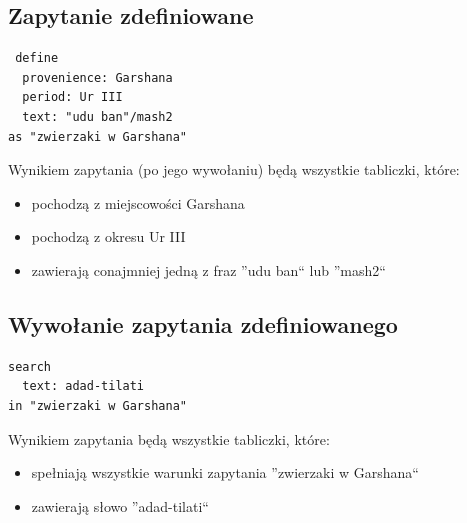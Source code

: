 \documentclass{pracamgr}
\begin{document}
\subsection{Zapytanie zdefiniowane}
\begin{verbatim}
 define
  provenience: Garshana
  period: Ur III
  text: "udu ban"/mash2
as "zwierzaki w Garshana"
\end{verbatim}
Wynikiem zapytania (po jego wywołaniu) będą wszystkie tabliczki, które:
\begin{itemize}
\item pochodzą z miejscowości Garshana
\item pochodzą z okresu Ur III
\item zawierają conajmniej jedną z fraz ''udu ban`` lub ''mash2``
\end{itemize}

\subsection{Wywołanie zapytania zdefiniowanego}
\begin{verbatim}
search
  text: adad-tilati
in "zwierzaki w Garshana"
\end{verbatim}
Wynikiem zapytania będą wszystkie tabliczki, które:
\begin{itemize}
 \item spełniają wszystkie warunki zapytania ''zwierzaki w Garshana``
\item zawierają słowo ''adad-tilati``
\end{itemize}
\end{document}
